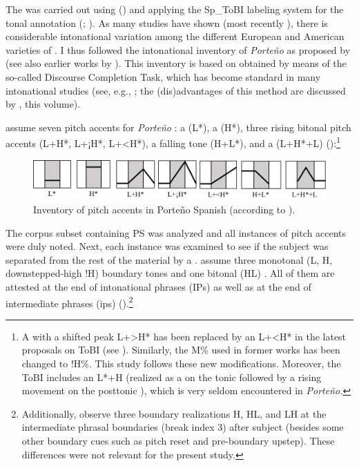 \documentclass[output=paper]{langsci/langscibook}
\begin{document}
The  was carried out using  (\citealt{Boersma.praat}) and applying the Sp\_ToBI labeling system for the tonal annotation (\citealt{Aguilar.2009}; \citealt{EstebasVilaplanaPrieto.2008,Prieto2010}). As many studies have shown (most recently \citealt{Hualde2015}), there is considerable intonational variation among the different European and American varieties of . I thus followed the intonational inventory of \textit{Porte{\~n}o}  as proposed by \citet{Gabriel2010incollection,Gabriel2013} (see also earlier works by \citealt{Toledo2000,Kaisse2001,Colantoni2004}). This inventory is based on  obtained by means of the so-called Discourse Completion Task, which has become standard in many intonational studies (see, e.g., \citealt{Prieto2010,frotaPrieto2015}; the (dis)advantages of this method are discussed by \citealt{Vanrell.2018}, this volume).\largerpage

{\citet[288–290]{Gabriel2010incollection} assume seven pitch accents for \textit{Porte{\~n}o} : a  (L*), a  (H*), three rising bitonal pitch accents (L+H*, L+¡H*, L+<H*), a falling tone (H+L*), and a  (L+H*+L) ():\footnote{A  with a shifted peak L+>H* has been replaced by an L+<H* in the latest proposals on  ToBI (see \citealt{Hualde2015}). Similarly, the M\%  used in former works has been changed to !H\%. This study follows these new modifications. Moreover, the  ToBI includes an L*+H (realized as a  on the tonic  followed by a rising movement on the posttonic ), which is very seldom encountered in \textit{Porte{\~n}o.}}}

  
\begin{figure}[t]
\includegraphics[width=\textwidth]{figures/pes-img1.png}
   \caption{\label{fig:pes:1}Inventory of pitch accents in Porte{\~n}o Spanish (according to \citealt{Gabriel2010incollection}).}
\end{figure}
  
The corpus subset containing PS was analyzed and all instances of pitch accents were duly noted. Next, each instance was examined to see if the subject was separated from the rest of the material by a . \citet{Gabriel2010incollection} assume three monotonal (L, H, downstepped-high !H) boundary tones and one bitonal (HL) . All of them are attested at the end of intonational phrases (IPs) as well as at the end of intermediate phrases (ips) ().\footnote{Additionally, \citet{Gabriel2011} observe three boundary realizations H\textminus{}, HL\textminus{}, and LH\textminus{} at the intermediate phrasal boundaries (break index 3) after subject (besides some other boundary cues such as pitch reset and pre-boundary upstep). These  differences were not relevant for the present study.
}
\end{document}
